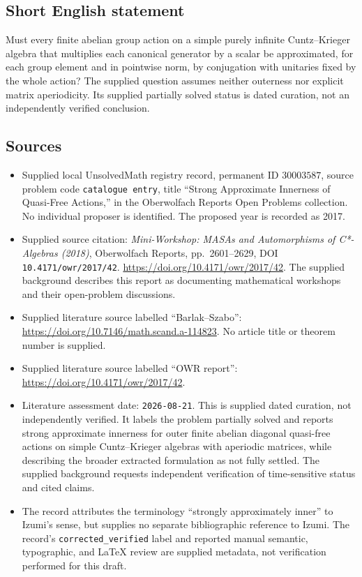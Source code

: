 \documentclass[11pt]{article}
\begin{document}
\subsection{Short English statement}
Must every finite abelian group action on a simple purely infinite Cuntz--Krieger algebra that multiplies each canonical generator by a scalar be approximated, for each group element and in pointwise norm, by conjugation with unitaries fixed by the whole action? The supplied question assumes neither outerness nor explicit matrix aperiodicity. Its supplied partially solved status is dated curation, not an independently verified conclusion.
\subsection{Sources}
\begin{itemize}
\item Supplied local UnsolvedMath registry record, permanent ID \(30003587\), source problem code \texttt{catalogue entry}, title ``Strong Approximate Innerness of Quasi-Free Actions,'' in the Oberwolfach Reports Open Problems collection. No individual proposer is identified. The proposed year is recorded as 2017.
\item Supplied source citation: \emph{Mini-Workshop: MASAs and Automorphisms of C*-Algebras (2018)}, Oberwolfach Reports, pp.\ 2601--2629, DOI \texttt{10.4171/owr/2017/42}. \url{https://doi.org/10.4171/owr/2017/42}. The supplied background describes this report as documenting mathematical workshops and their open-problem discussions.
\item Supplied literature source labelled ``Barlak--Szabo'': \url{https://doi.org/10.7146/math.scand.a-114823}. No article title or theorem number is supplied.
\item Supplied literature source labelled ``OWR report'': \url{https://doi.org/10.4171/owr/2017/42}.
\item Literature assessment date: \texttt{2026-08-21}. This is supplied dated curation, not independently verified. It labels the problem partially solved and reports strong approximate innerness for outer finite abelian diagonal quasi-free actions on simple Cuntz--Krieger algebras with aperiodic matrices, while describing the broader extracted formulation as not fully settled. The supplied background requests independent verification of time-sensitive status and cited claims.
\item The record attributes the terminology ``strongly approximately inner'' to Izumi's sense, but supplies no separate bibliographic reference to Izumi. The record's \texttt{corrected\_verified} label and reported manual semantic, typographic, and LaTeX review are supplied metadata, not verification performed for this draft.
\end{itemize}
\end{document}
